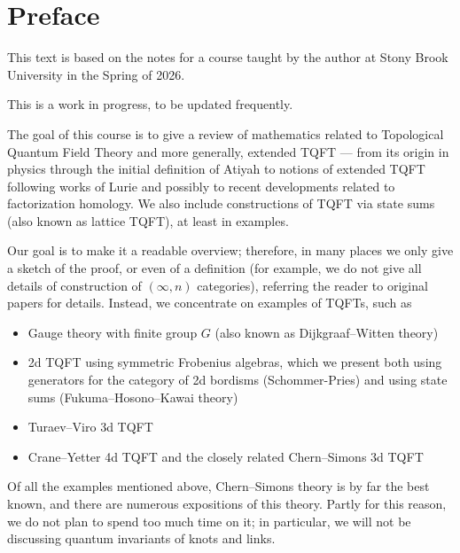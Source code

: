 \chapter*{Preface}%
This text is based on the notes for a course taught by the
author at Stony Brook University in the Spring of 2026.

This is a work in progress, to be updated frequently.


The goal of this course is to give a review of mathematics related
to Topological Quantum Field Theory and more generally, extended TQFT ---
from its origin in physics through the initial definition of Atiyah to notions
of extended TQFT following works of Lurie and possibly to recent
developments related to factorization homology. We also
include constructions of TQFT via state sums (also known as lattice
TQFT), at least in examples.

Our goal is to make it a readable overview; therefore, in many places we only
give a sketch of the proof, or even of a definition (for example, we do not give
all details of construction of $(\infty, n)$ categories),  referring the
reader to original papers for details. Instead, we concentrate on examples of
TQFTs, such as
\begin{itemize}
  \item Gauge theory with finite group $G$ (also known as Dijkgraaf--Witten
  theory)
  \item 2d TQFT using symmetric Frobenius algebras, which we present both using
  generators for the category of 2d bordisms (Schommer-Pries)
  and using state sums
  (Fukuma--Hosono--Kawai theory)
  \item Turaev--Viro 3d TQFT
  \item Crane--Yetter 4d TQFT and the closely related Chern--Simons 3d TQFT
\end{itemize}

Of all the examples mentioned above, Chern--Simons theory is by far the best
known, and there are numerous expositions of this theory. Partly for this
reason, we do not plan to spend too much time on it; in particular, we will not
be discussing quantum invariants of knots and links.




\clearpage
